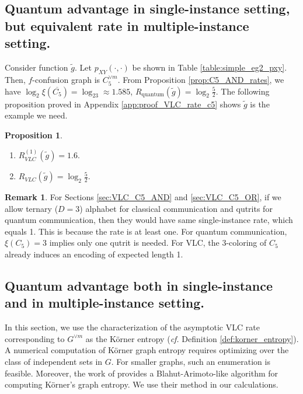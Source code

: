 \documentclass[journal, onecolumn, draftcls]{IEEEtran}
\theoremstyle{definition}
\newtheorem{proposition}{Proposition}
\newtheorem{remark}{Remark}
\begin{document}
\subsection{Quantum advantage in single-instance setting, but equivalent rate  in multiple-instance setting.\label{sec:VLC_C5_OR}}
Consider function $\tilde g$. Let $p_{XY}(\cdot,\cdot)$  be shown in Table \ref{table:simple_eg2_pxy}. Then, $f$-confusion graph is $C_5^{\lor m}$. From Proposition \ref{prop:C5_AND_rates}, we have $\log_2\xi(\overline{C_5}) =\log_23\approx 1.585$,   $R_{\text{quantum}}(\tilde g) =  \log_2 \frac{5}{2}$. The following proposition proved in Appendix \ref{app:proof_VLC_rate_c5} shows  $\tilde g$ is the example we need.
\begin{proposition}\label{prop:VLC_rate_c5_OR}
\begin{enumerate}
    \item $ R^{(1)}_{VLC}(\tilde g) = 1.6$.
    \item  $R_{VLC}(\tilde g) =  \log_2 \frac{5}{2}$.
\end{enumerate}
\end{proposition}
\begin{remark}
   For Sections \ref{sec:VLC_C5_AND} and \ref{sec:VLC_C5_OR}, if we allow ternary ($D=3$) alphabet for classical communication and qutrits for quantum communication, then they would have same single-instance rate, which equals 1. This is because the rate is at least one. For quantum communication, $\xi(C_5) =3$ implies only one qutrit is needed. For VLC, the $3$-coloring of $C_5$ already induces an encoding of expected length 1.
\end{remark} 
\subsection{Quantum advantage both in single-instance and in multiple-instance setting.\label{sec:VLC_quantum_in_single_and_multi_instance}}

In this section, we use the characterization of the asymptotic VLC rate corresponding to $G^{\lor m}$ as the {K\"orner} entropy ({\it cf.} Definition \ref{def:korner_entropy}). A numerical computation of  {K\"orner} graph entropy requires optimizing over the class of independent sets in $G$. For smaller graphs, such an enumeration is feasible. Moreover, the work of \cite{HarangiNB24} provides a Blahut-Arimoto-like algorithm for computing  K\"orner's graph entropy. We use their method in our calculations.
\end{document}
